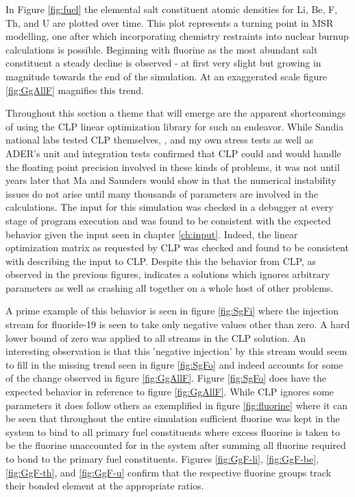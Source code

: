 In Figure \ref{fig:fuel} the elemental salt constituent atomic
densities for Li, Be, F, Th, and U are plotted over time. This plot represents
a turning point in MSR modelling, one after which incorporating chemistry 
restraints into nuclear burnup calculations is possible. Beginning with fluorine
as the most abundant salt constituent a steady decline is observed - at first
very slight but growing in magnitude towards the end of the simulation. At an
exaggerated scale figure \ref{fig:GgAllF} magnifies this trend. 

Throughout this section a theme that will emerge are the apparent shortcomings
of using the CLP linear optimization library for such an endeavor. While Sandia
national labs tested CLP themselves, \cite{gearhart_comparison_2013}, and my
own stress tests as well as ADER's unit and integration tests confirmed that
CLP could and would handle the floating point precision involved in these kinds
of problems, it was not until years later that Ma and Saunders would show in
\cite{STANFORD} that the numerical instability issues do not arise until many
thousands of parameters are involved in the calculations. The input for this
simulation was checked in a debugger at every stage of program execution and was
found to be consistent with the expected behavior given the input seen in
chapter \ref{ch:input}. Indeed, the linear optimization matrix as requested by
CLP was checked and found to be consistent with describing the input to CLP.
Despite this the behavior from CLP, as observed in the previous figures, 
indicates a solutions which ignores arbitrary parameters as well as crashing
all together on a whole host of other problems.

A prime example of this behavior is seen in figure \ref{fig:SgFi} where the
injection stream for fluoride-19 is seen to take only negative values other than
zero. A hard lower bound of zero was applied to all streams in the CLP solution.
An interesting observation is that this 'negative injection' by this stream
would seem to fill in the missing trend seen in figure \ref{fig:SgFo} and indeed
accounts for some of the change observed in figure \ref{fig:GgAllF}. Figure
\ref{fig:SgFo} does have the expected behavior in reference to figure
\ref{fig:GgAllF}. While CLP ignores some parameters it does follow others as
exemplified in figure \ref{fig:fluorine} where it can be seen that throughout
the entire simulation sufficient fluorine was kept in the system to bind to all
primary fuel constituents where excess fluorine is taken to be the fluorine 
unaccounted for in the system after summing all fluorine required to bond to the
primary fuel constituents. Figures \ref{fig:GgF-li}, \ref{fig:GgF-be},
\ref{fig:GgF-th}, and \ref{fig:GgF-u} confirm that the respective fluorine
groups track their bonded element at the appropriate ratios.

